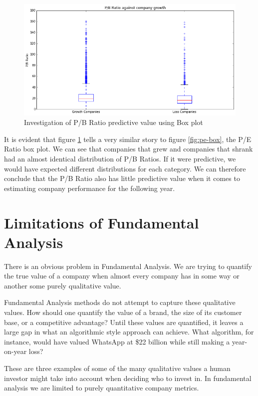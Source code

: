\documentclass{report}
\begin{document}
\begin{figure}[H]
	\caption{Investigation of P/B Ratio predictive value using Box plot}
	\centerline{\includegraphics[width=\textwidth]{vis/pb_box.png}}
	\label{fig:pb-box}
\end{figure}

It is evident that figure \ref{fig:pb-box} tells a very similar story to figure \ref{fig:pe-box}, the P/E Ratio box plot. We can see that companies that grew and companies that shrank had an almost identical distribution of P/B Ratios. If it were predictive, we would have expected different distributions for each category. We can therefore conclude that the P/B Ratio also has little predictive value when it comes to estimating company performance for the following year.

\section{Limitations of Fundamental Analysis}

There is an obvious problem in Fundamental Analysis. We are trying to quantify the true value of a company when almost every company has in some way or another some purely qualitative value.

Fundamental Analysis methods do not attempt to capture these qualitative values. How should one quantify the value of a brand, the size of its customer base, or a competitive advantage? Until these values are quantified, it leaves a large gap in what an algorithmic style approach can achieve. What algorithm, for instance, would have valued WhatsApp at \$22 billion while still making a year-on-year loss? \cite{whatsapp}

These are three examples of some of the many qualitative values a human investor might take into account when deciding who to invest in. In fundamental analysis we are limited to purely quantitative company metrics.
\end{document}
